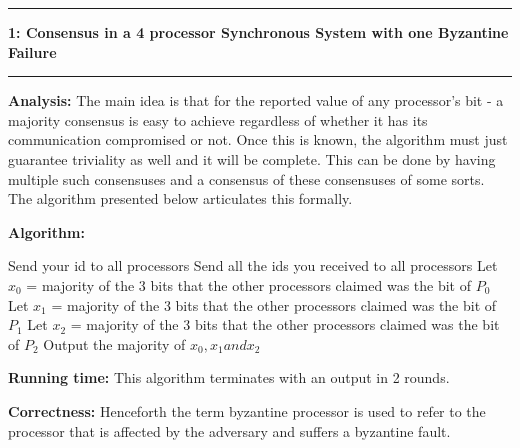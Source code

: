 \documentclass[11pt]{article}
\newcommand\question[2]{\vspace{.25in}\hrule\textbf{#1: #2}\vspace{.5em}\hrule\vspace{.10in}}
\newcommand\analysis{\vspace{.10in}\textbf{Analysis: }\newline}
\newcommand\algorithm{\vspace{.10in}\textbf{Algorithm: }}
\newcommand\correctness{\vspace{.10in}\textbf{Correctness: }\newline}
\newcommand\runtime{\vspace{.10in}\textbf{Running time: }\newline}
\begin{document}
\raggedright
\newcommand\NAME{Siddharth Joshi}  %
\newcommand\HWNUM{2}              %


\question{1}{Consensus in a 4 processor Synchronous System with one Byzantine Failure} 

\analysis
The main idea is that for the reported value of any processor's bit - a majority consensus is easy to achieve regardless of whether it has its communication compromised or not. Once this is known, the algorithm must just guarantee triviality as well and it will be complete. This can be done by having multiple such consensuses and a consensus of these consensuses of some sorts. The algorithm presented below articulates this formally. 

\algorithm
\begin{algorithmic}
\State Send your id to all processors 
\State Send all the ids you received to all processors 
\State Let $x_0$ = majority of the 3 bits that the other processors claimed was the bit of $P_0$
\State Let $x_1$ = majority of the 3 bits that the other processors claimed was the bit of $P_1$
\State Let $x_2$ = majority of the 3 bits that the other processors claimed was the bit of $P_2$
\State Output the majority of $x_0, x_1 and x_2$
\end{algorithmic}

\runtime
This algorithm terminates with an output in 2 rounds.

\correctness
Henceforth the term byzantine processor is used to refer to the processor that is affected by the adversary and suffers a byzantine fault. \newline
\end{document}
